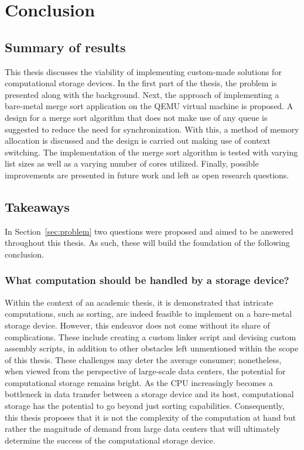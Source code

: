 \section{Conclusion}
\subsection{Summary of results}
This thesis discusses the viability of implementing custom-made solutions for
computational storage devices. In the first part of the thesis, the problem is
presented along with the background. Next, the approach of implementing a
bare-metal merge sort application on the QEMU virtual machine is proposed. A
design for a merge sort algorithm that does not make use of any queue is
suggested to reduce the need for synchronization. With this, a method of memory
allocation is discussed and the design is carried out making use of context
switching. The implementation of the merge sort algorithm is tested with varying
list sizes as well as a varying number of cores utilized. Finally, possible
improvements are presented in future work and left as open research questions.

\subsection{Takeaways}
In Section~\ref{sec:problem} two questions were proposed and aimed to be
answered throughout this thesis. As such, these will build the foundation of the
following conclusion.

\subsubsection*{What computation should be handled by a storage device?}
Within the context of an academic thesis, it is demonstrated that intricate
computations, such as sorting, are indeed feasible to implement on a bare-metal
storage device. However, this endeavor does not come without its share of
complications. These include creating a custom linker script and devising custom
assembly scripts, in addition to other obstacles left unmentioned within the
scope of this thesis. These challenges may deter the average consumer;
nonetheless, when viewed from the perspective of large-scale data centers, the
potential for computational storage remains bright. As the CPU increasingly
becomes a bottleneck in data transfer between a storage device and its host,
computational storage has the potential to go beyond just sorting capabilities.
Consequently, this thesis proposes that it is not the complexity of the
computation at hand but rather the magnitude of demand from large data centers
that will ultimately determine the success of the computational storage device.


